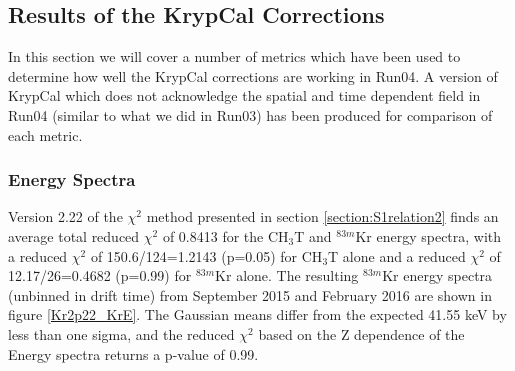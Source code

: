 \documentclass[a4paper,12pt]{article}
\begin{document}
{%

\subsection{Results of the KrypCal Corrections} \label{Results}

In this section we will cover a number of metrics which have been used to determine how well the KrypCal corrections are working in Run04.  A version of KrypCal which does not acknowledge the spatial and time dependent field in Run04 (similar to what we did in Run03) has been produced for comparison of each metric.


\subsubsection{Energy Spectra}\label{Result:Spectra}

Version 2.22 of the $\chi^2$ method presented in section \ref{section:S1relation2} finds an average total reduced $\chi^2$ of 0.8413 for the CH$_3$T and $^{83m}$Kr energy spectra, with a reduced $\chi^2$ of  150.6/124=1.2143 (p=0.05) for CH$_3$T alone and a reduced $\chi^2$ of 12.17/26=0.4682 (p=0.99) for $^{83m}$Kr alone.  The resulting $^{83m}$Kr energy spectra (unbinned in drift time) from September 2015 and February 2016 are shown in figure \ref{Kr2p22_KrE}.  The Gaussian means differ from the expected 41.55 keV by less than one sigma, and the reduced $\chi^2$ based on the Z dependence of the Energy spectra returns a p-value of 0.99.

}
\end{document}
